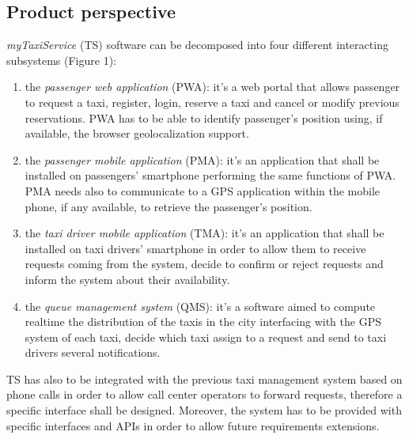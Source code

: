 
\subsection{Product perspective }

\emph{myTaxiService} (TS) software can be decomposed into four different
interacting subsystems (Figure 1):
\begin{enumerate}
\item the \emph{passenger web application} (PWA): it's a web portal that
allows passenger to request a taxi, register, login, reserve a taxi
and cancel or modify previous reservations. PWA has to be able to
identify passenger's position using, if available, the browser geolocalization
support.
\item the \emph{passenger mobile application }(PMA): it's an application
that shall be installed on passengers' smartphone performing the same
functions of PWA. PMA needs also to communicate to a GPS application
within the mobile phone, if any available, to retrieve the passenger's
position.
\item the \emph{taxi driver mobile application} (TMA): it's an application
that shall be installed on taxi drivers' smartphone in order to allow
them to receive requests coming from the system, decide to confirm
or reject requests and inform the system about their availability. 
\item the \emph{queue management system} (QMS): it's a software aimed to
compute realtime the distribution of the taxis in the city interfacing
with the GPS system of each taxi, decide which taxi assign to a request
and send to taxi drivers several notifications.
\end{enumerate}
TS has also to be integrated with the previous taxi management system
based on phone calls in order to allow call center operators to forward
requests, therefore a specific interface shall be designed. Moreover,
the system has to be provided with specific interfaces and APIs in
order to allow future requirements extensions.

